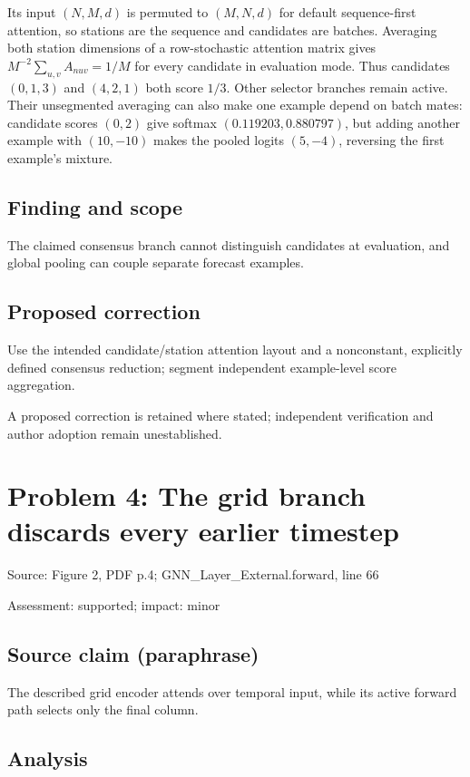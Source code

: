 \documentclass[11pt]{article}
\begin{document}
Its input \((N,M,d)\) is permuted to \((M,N,d)\) for default sequence-first attention, so stations are the sequence and candidates are batches. Averaging both station dimensions of a row-stochastic attention matrix gives \(M^{-2}\sum_{u,v}A_{nuv}=1/M\) for every candidate in evaluation mode. Thus candidates \((0,1,3)\) and \((4,2,1)\) both score \(1/3\). Other selector branches remain active. Their unsegmented averaging can also make one example depend on batch mates: candidate scores \((0,2)\) give softmax \((0.119203,0.880797)\), but adding another example with \((10,-10)\) makes the pooled logits \((5,-4)\), reversing the first example’s mixture.

\subsection*{Finding and scope}

The claimed consensus branch cannot distinguish candidates at evaluation, and global pooling can couple separate forecast examples.

\subsection*{Proposed correction}

Use the intended candidate/station attention layout and a nonconstant, explicitly defined consensus reduction; segment independent example-level score aggregation.

A proposed correction is retained where stated; independent verification and author adoption remain unestablished.

\section*{Problem 4: The grid branch discards every earlier timestep}

Source: Figure 2, PDF p.4; GNN\_Layer\_External.forward, line 66

Assessment: supported; impact: minor

\subsection*{Source claim (paraphrase)}

The described grid encoder attends over temporal input, while its active forward path selects only the final column.

\subsection*{Analysis}
\end{document}
